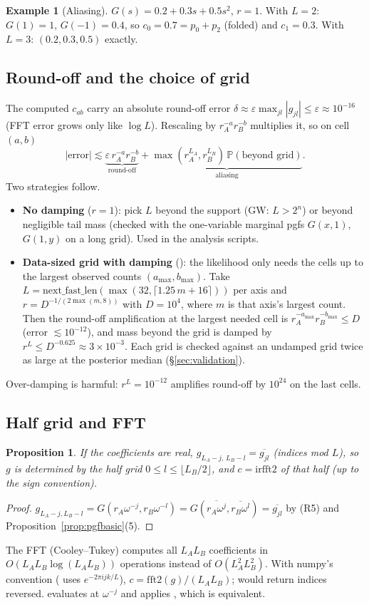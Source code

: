 \documentclass[11pt]{article}
\newtheorem{proposition}[theorem]{Proposition}
\theoremstyle{definition}
\newtheorem{example}[theorem]{Example}
\theoremstyle{remark}
\newcommand{\Prob}{\mathbb{P}}
\newcommand{\code}[1]{\texttt{\detokenize{#1}}}
\begin{document}
\begin{example}[Aliasing]
$G(s)=0.2+0.3s+0.5s^2$, $r=1$. With $L=2$: $G(1)=1$, $G(-1)=0.4$, so $c_0=0.7=p_0+p_2$ (folded) and $c_1=0.3$. With $L=3$: $(0.2,0.3,0.5)$ exactly.
\end{example}

\subsection{Round-off and the choice of grid}
The computed $c_{ab}$ carry an absolute round-off error $\delta\approx\varepsilon\max_{jl}|g_{jl}|\le\varepsilon\approx10^{-16}$ (FFT error grows only like $\log L$). Rescaling by $r_A^{-a}r_B^{-b}$ multiplies it, so on cell $(a,b)$
\[
|\text{error}|\lesssim\underbrace{\varepsilon\,r_A^{-a}r_B^{-b}}_{\text{round-off}}+\underbrace{\max(r_A^{L_A},r_B^{L_B})\,\Prob(\text{beyond grid})}_{\text{aliasing}} .
\]
Two strategies follow.
\begin{itemize}
\item \textbf{No damping} ($r=1$): pick $L$ beyond the support (GW: $L>2^n$) or beyond negligible tail mass (checked with the one-variable marginal pgfs $G(x,1)$, $G(1,y)$ on a long grid). Used in the analysis scripts.
\item \textbf{Data-sized grid with damping} (\code{exact_gw}): the likelihood only needs the cells up to the largest observed counts $(a_{\max},b_{\max})$. Take $L=\mathrm{next\_fast\_len}(\max(32,\lceil1.25\,m+16\rceil))$ per axis and $r=D^{-1/(2\max(m,8))}$ with $D=10^4$, where $m$ is that axis's largest count. Then the round-off amplification at the largest needed cell is $r_A^{-a_{\max}}r_B^{-b_{\max}}\le D$ (error $\lesssim10^{-12}$), and mass beyond the grid is damped by $r^{L}\le D^{-0.625}\approx3\times10^{-3}$. Each grid is checked against an undamped grid twice as large at the posterior median (\S\ref{sec:validation}).
\end{itemize}
Over-damping is harmful: $r^L=10^{-12}$ amplifies round-off by $10^{24}$ on the last cells.

\subsection{Half grid and FFT}
\begin{proposition}\label{prop:half}
If the coefficients are real, $g_{L_A-j,\,L_B-l}=\overline{g_{jl}}$ (indices mod $L$), so $g$ is determined by the half grid $0\le l\le\lfloor L_B/2\rfloor$, and $c=\mathrm{irfft2}$ of that half (up to the sign convention).
\end{proposition}
\begin{proof}
$g_{L_A-j,L_B-l}=G(r_A\omega^{-j},r_B\omega^{-l})=G(\overline{r_A\omega^j},\overline{r_B\omega^l})=\overline{g_{jl}}$ by (R5) and Proposition~\ref{prop:pgfbasic}(5).
\end{proof}
\noindent The FFT (Cooley--Tukey) computes all $L_AL_B$ coefficients in $O(L_AL_B\log(L_AL_B))$ operations instead of $O(L_A^2L_B^2)$. With numpy's convention (\code{fft} uses $e^{-2\pi ijk/L}$), $c=\mathrm{fft2}(g)/(L_AL_B)$; \code{ifft2} would return indices reversed. \code{exact_gw} evaluates at $\omega^{-j}$ and applies \code{irfft2}, which is equivalent.
\end{document}
